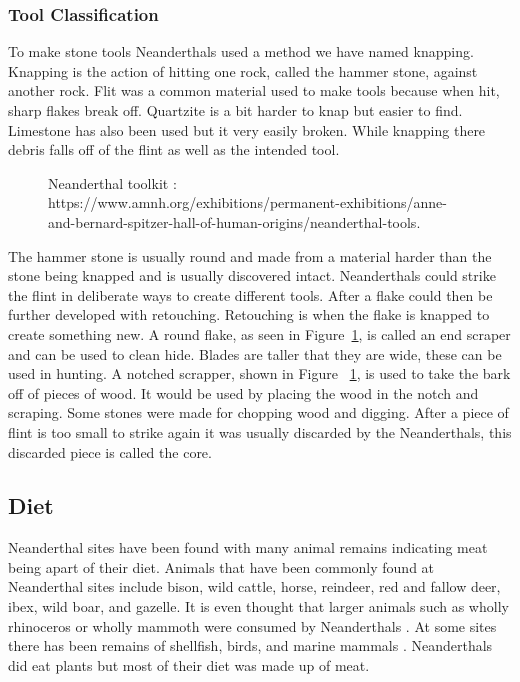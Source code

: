 \subsubsection{Tool Classification}
To make stone tools Neanderthals used a method we have named knapping. Knapping is the action of hitting one rock, called the hammer stone, against another rock. Flit was a common material used to make tools because when hit, sharp flakes break off. Quartzite is a bit harder to knap but easier to find. Limestone has also been used but it very easily broken. While knapping there debris falls off of the flint as well as the intended tool. 
\begin{figure}[!ht]
	\begin{center}
	\end{center}
	\caption{Neanderthal toolkit : https://www.amnh.org/exhibitions/permanent-exhibitions/anne-and-bernard-spitzer-hall-of-human-origins/neanderthal-tools. } \label{fig:Neanderthal-tool}
\end{figure}The hammer stone is usually round and made from a material harder than the stone being knapped and is usually discovered intact. Neanderthals could strike the flint in deliberate ways to create different tools. After a flake could then be further developed with retouching. Retouching is when the flake is knapped to create something new. A round flake, as seen in Figure~\ref{fig:Neanderthal-tool}, is called an end scraper and can be used to clean hide. Blades are taller that they are wide, these can be used in hunting. A notched scrapper, shown in Figure ~\ref{fig:Neanderthal-tool}, is used to take the bark off of pieces of wood. It would be used by placing the wood in the notch and scraping. Some stones were made for chopping wood and digging. After a piece of flint is too small to strike again it was usually discarded by the Neanderthals, this discarded piece is called the core. 

\subsection{Diet}
Neanderthal sites have been found with many animal remains indicating meat being apart of their diet. Animals that have been commonly found at Neanderthal sites include bison, wild cattle, horse, reindeer, red and fallow deer, ibex, wild boar, and gazelle. It is even thought that larger animals such as wholly rhinoceros or wholly mammoth were consumed by Neanderthals \cite{Harvati2010}. At some sites there has been remains of shellfish, birds, and marine mammals \cite{Harvati2010}. Neanderthals did eat plants but most of their diet was made up of meat. 


